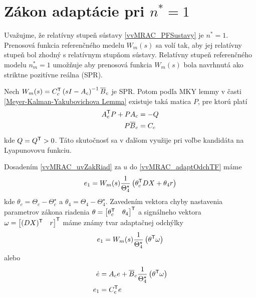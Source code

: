 \documentclass[a4paper, 10pt, ]{article}
\begin{document}
\section{Zákon adaptácie pri $n^* = 1$}


Uvažujme, že relatívny stupeň sústavy \eqref{vvMRAC_PFSustavy} je $n^* = 1$. Prenosová funkcia referenčného medelu $W_m(s)$ sa volí tak, aby jej relatívny stupeň bol zhodný s relatívnym stupňom sústavy. Relatívny stupeň referenčného modelu $n_m^* = 1$ umožňuje aby prenosová funkcia $W_m(s)$ bola navrhnutá ako striktne pozitívne reálna (SPR).

Nech $W_m(s) = C_c^{\mathsf{T}} \left( s I - A_c \right)^{-1} \overline{B}_c$ je SPR. Potom podľa MKY lemmy v časti \ref{Meyer-Kalman-Yakubovichova Lemma} existuje taká matica $P$, pre ktorú platí
\begin{subequations} \label{vvMRAC_dosledkyMKYlemmy}
	\begin{align}
		A_c^{\mathsf{T}} P  +  P  A_c  &=  - Q \\
		P  \overline{B}_c &=   C_c
	\end{align}
\end{subequations}
kde $Q = Q^{\mathsf{T}} > 0$. Táto skutočnosť sa v ďalšom využije pri voľbe kandidáta na Lyapunovovu funkciu.

Dosadením \eqref{vvMRAC_uvZakRiad} za $u$ do \eqref{vvMRAC_adaptOdchTF} máme
\begin{equation} \label{vvMRAC_adaptOdchmedziDefTF}
	e_1 = W_m(s) \frac{1}{\Theta_4^\star} \left( \theta_c^{\mathsf{T}} D X + \theta_4 r \right)
\end{equation}
kde $\theta_c = \Theta_c - \Theta_c^\star$ a $\theta_4 = \Theta_4 - \Theta_4^\star$. Zavedením vektora chyby nastavenia parametrov zákona riadenia $\theta = \begin{bmatrix}  \theta_c^{\mathsf{T}} & \theta_4 \end{bmatrix}^{\mathsf{T}}$ a signálneho vektora $\omega = \begin{bmatrix} (D X)^{\mathsf{T}} & r \end{bmatrix}^{\mathsf{T}}$ máme známy tvar adaptačnej odchýlky
\begin{equation} \label{vvMRAC_adaptOdchDefTF}
	e_1 = W_m(s)  \frac{1}{\Theta_4^\star} \left( \theta^{\mathsf{T}} \omega \right)
\end{equation}
alebo
\begin{subequations} \label{vvMRAC_adaptOdchDefSS}
	\begin{align}
		\dot{e} &= A_c e + \overline{B}_c \frac{1}{\Theta_4^\star} \left( \theta^{\mathsf{T}} \omega \right) \\
		e_1 &= C_c^{\mathsf{T}} e
	\end{align}
\end{subequations}
\end{document}
